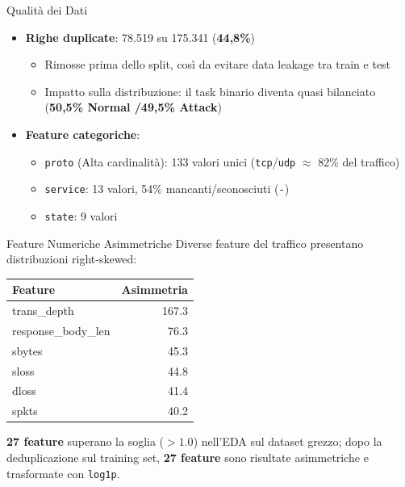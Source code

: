 \documentclass{beamer}
\begin{document}
\begin{frame}{Qualità dei Dati}
  \begin{itemize}
    \item \textbf{Righe duplicate}: 78.519 su 175.341 (\textbf{44,8\%})
      \begin{itemize}
        \item Rimosse prima dello split, così da evitare data leakage tra train e test
        \item Impatto sulla distribuzione: il task binario diventa quasi bilanciato (\textbf{50,5\% Normal /49,5\% Attack})
      \end{itemize}
    \vspace{0.3cm}
    \item \textbf{Feature categoriche}:
      \begin{itemize}
        \item \texttt{proto} (Alta cardinalità): 133 valori unici (\texttt{tcp}/\texttt{udp}
          $\approx$ 82\% del traffico)
        \item \texttt{service}: 13 valori, 54\% mancanti/sconosciuti (\texttt{-})
        \item \texttt{state}: 9 valori
      \end{itemize}
  \end{itemize}
\end{frame}

\begin{frame}{Feature Numeriche Asimmetriche}
  Diverse feature del traffico presentano distribuzioni right-skewed:
  \begin{center}
    \begin{tabular}{lr}
      \toprule
      \textbf{Feature} & \textbf{Asimmetria} \\
      \midrule
      trans\_depth & 167.3 \\
      response\_body\_len & 76.3 \\
      sbytes & 45.3 \\
      sloss & 44.8 \\
      dloss & 41.4 \\
      spkts & 40.2 \\
      \bottomrule
    \end{tabular}
  \end{center}
  \vspace{0.3cm}
  \textbf{27 feature} superano la soglia ($> 1.0$) nell'EDA sul dataset grezzo; dopo la deduplicazione sul training set, \textbf{27 feature} sono risultate asimmetriche e trasformate con \texttt{log1p}.
\end{frame}
\end{document}
